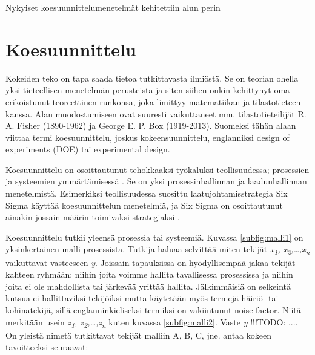 \documentclass[12pt,a4paper,finnish]{tutthesis}
\newcommand\todo[1]{{\color{red}!!!TODO: #1}} %
\begin{document}
Nykyiset koesuunnittelumenetelmät kehitettiin alun perin





\chapter{Koesuunnittelu}
\label{ch:doe}

Kokeiden teko on tapa saada tietoa tutkittavasta ilmiöstä. Se on teorian
ohella yksi tieteellisen menetelmän perusteista ja siten siihen onkin
kehittynyt oma erikoistunut teoreettinen runkonsa, joka limittyy matematiikan ja
tilastotieteen kanssa. Alan muodostumiseen ovat suuresti vaikuttaneet mm.
tilastotieteilijät R. A. Fisher (1890-1962) ja George E. P. Box (1919-2013).
Suomeksi tähän alaan viittaa termi koesuunnittelu, joskus kokeensuunnittelu,
englanniksi design of experiments (DOE) tai experimental design.

Koesuunnittelu on osoittautunut tehokkaaksi työkaluksi teollisuudessa; prosessien
ja systeemien ymmärtämisessä \parencite{Antony2006} . Se on yksi prosessinhallinnan
ja laadunhallinnan menetelmistä. Esimerkiksi teollisuudessa suosittu laatujohtamisstrategia
Six Sigma käyttää koesuunnittelun menetelmiä, ja Six Sigma on osoittautunut
ainakin jossain määrin
toimivaksi strategiaksi \parencite{Dusharme2001}.

Koesuunnittelu tutkii yleensä prosessia tai systeemiä. Kuvassa \ref{subfig:malli1}
on yksinkertainen malli prosessista. Tutkija haluaa selvittää miten tekijät
\textit{x\textsubscript{1}, x\textsubscript{2},\ldots,x\textsubscript{n}}
vaikuttavat vasteeseen \textit{y}.
Joissain tapauksissa on hyödyllisempää
jakaa tekijät kahteen ryhmään: niihin joita voimme hallita tavallisessa
prosessissa ja niihin joita ei ole mahdollista tai järkevää yrittää
hallita. Jälkimmäisiä on selkeintä kutsua ei-hallittaviksi tekijöiksi
mutta käytetään myös termejä häiriö- tai kohinatekijä, sillä englanninkieliseksi
termiksi on vakiintunut noise factor.
Niitä merkitään usein
\textit{z\textsubscript{1}, z\textsubscript{2},\ldots,z\textsubscript{n}} kuten
kuvassa \ref{subfig:malli2}.
Vaste \textit{y} \todo{....}
On yleistä nimetä tutkittavat tekijät malliin A, B, C, jne.
\textcite[s. 3]{Montgomery2012} antaa kokeen
tavoitteeksi seuraavat:
\end{document}
